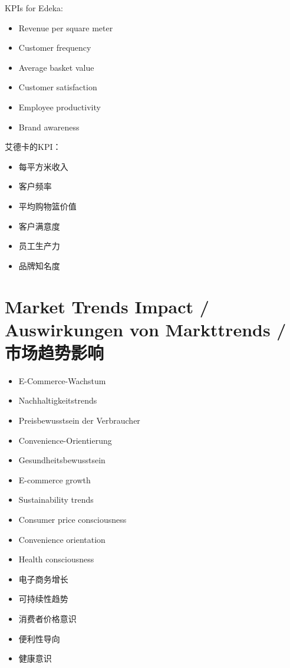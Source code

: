 KPIs for Edeka:
\begin{itemize}
    \item Revenue per square meter
    \item Customer frequency
    \item Average basket value
    \item Customer satisfaction
    \item Employee productivity
    \item Brand awareness
\end{itemize}

艾德卡的KPI：
\begin{itemize}
    \item 每平方米收入
    \item 客户频率
    \item 平均购物篮价值
    \item 客户满意度
    \item 员工生产力
    \item 品牌知名度
\end{itemize}

\section{Market Trends Impact / Auswirkungen von Markttrends / 市场趋势影响}

\begin{otherlanguage}{ngerman}
\begin{itemize}
    \item E-Commerce-Wachstum
    \item Nachhaltigkeitstrends
    \item Preisbewusstsein der Verbraucher
    \item Convenience-Orientierung
    \item Gesundheitsbewusstsein
\end{itemize}
\end{otherlanguage}

\begin{itemize}
    \item E-commerce growth
    \item Sustainability trends
    \item Consumer price consciousness
    \item Convenience orientation
    \item Health consciousness
\end{itemize}

\begin{itemize}
    \item 电子商务增长
    \item 可持续性趋势
    \item 消费者价格意识
    \item 便利性导向
    \item 健康意识
\end{itemize}
